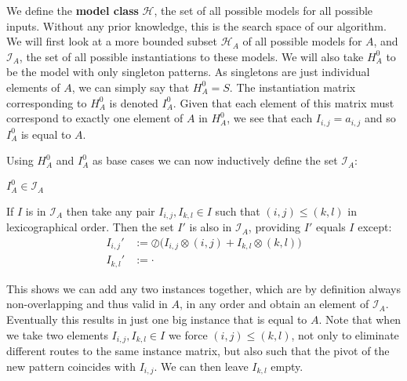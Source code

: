 \documentclass{llncs}
\begin{document}
We define the \textbf{model class} $\mathcal{H}$, the set of all possible models for all possible inputs. Without any prior knowledge, this is the search space of our algorithm. We will first look at a more bounded subset $\mathcal{H}_A$ of all possible models for $A$, and $\mathcal{I}_A$, the set of all possible instantiations to these models. We will also take $H_A^0$ to be the model with only singleton patterns. As singletons are just individual elements of $A$, we can simply say that $H_A^0=S$. The instantiation matrix corresponding to $H_A^0$ is denoted ${I}_A^0$. Given that each element of this matrix must correspond to exactly one element of $A$ in $H_A^0$, we see that each ${I}_{i,j} = a_{i,j}$ and so ${I}_A^0$ is equal to $A$. 

Using $H_A^0$ and ${I}_A^0$ as base cases we can now inductively define the set $\mathcal{I}_A$: %
\begin{description}[labelwidth=\widthof{\bfseries By induction}]
\item[Base case] ${I}_A^0 \in \mathcal{I}_A$
\item[By induction] If ${I}$ is in $\mathcal{I}_A$ then take any pair ${I}_{i,j},{I}_{k,l} \in {I}$ such that $(i,j)\leq(k,l)$ in lexicographical order. Then the set ${I}'$ is also in $\mathcal{I}_A$, providing ${I}'$ equals ${I}$ except:
\vspace{-1.5\baselineskip}
\begin{align*}
{I}_{i,j}' &:= \oslash \big( {I}_{i,j} \otimes (i,j) + {I}_{k,l} \otimes (k,l) \big) \\
{I}_{k,l}' &:= \cdot %
\end{align*}
\end{description}

\noindent This shows we can add any two instances together, which are by definition always non-overlapping and thus valid in $A$, in any order and obtain an element of $\mathcal{I}_A$. Eventually this results in just one big instance that is equal to $A$. Note that when we take two elements ${I}_{i,j},{I}_{k,l} \in {I}$ we force $(i,j)\leq(k,l)$, not only to eliminate different routes to the same instance matrix, but also such that the pivot of the new pattern coincides with ${I}_{i,j}$. We can then leave ${I}_{k,l}$ empty.
\end{document}
